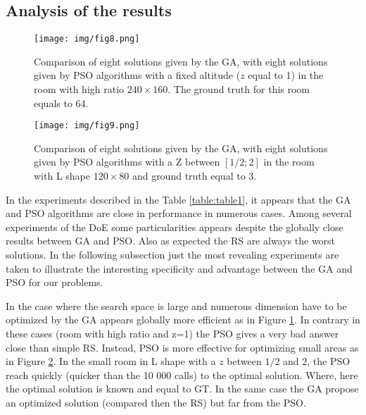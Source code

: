 

\subsection{Analysis of the results }

\begin{figure}[!]
  \texttt{[image: img/fig8.png]}
  \caption{Comparison of eight solutions given by the GA, with eight solutions given by PSO algorithms with a fixed altitude ($z$ equal to 1) in the room with high ratio $240\times160$. The ground truth for this room equals to 64.}
  \label{fig:bigRz1}
   \endminipage\hfill
\end{figure}
%
%
\begin{figure}[!]
  \texttt{[image: img/fig9.png]}
  \caption{Comparison of eight solutions given by the GA, with eight solutions given by PSO algorithms with a Z between $[1/2; 2]$ in the room with L shape $120\times80$ and ground truth equal to 3.}\label{fig:RLz2}
   \endminipage\hfill
\end{figure}
In the experiments described in the Table \ref{table:table1}, it appears that the GA and PSO algorithms are close in performance in numerous cases. Among several experiments of the DoE some particularities appears despite the globally close results between GA and PSO. Also as expected the RS are always the worst solutions.
 In the following subsection just the most revealing experiments are taken to illustrate the interesting specificity and advantage between the GA and PSO for our problems.

In the case where the search space is large and numerous dimension have to be optimized by the GA appears globally more efficient as in Figure \ref{fig:bigRz1}. In contrary in these cases (room with high ratio and z=1) the PSO gives a very bad answer close than simple RS.
 Instead, PSO is more effective for optimizing small areas as in Figure \ref{fig:RLz2}. In the small room in L shape with a $z$ between $1/2$ and $2$, the PSO reach quickly (quicker than the 10 000 calls) to the optimal solution. Where, here the optimal solution is known and equal to GT. In the same case the GA propose an optimized solution (compared then the RS) but far from the PSO.
 

